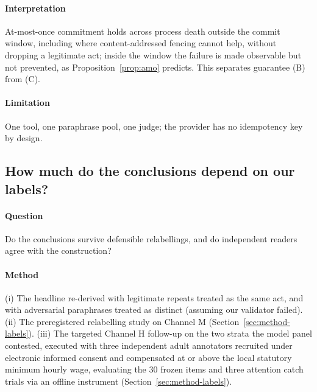 \paragraph{Interpretation} At-most-once commitment holds across process death outside the commit window, including where content-addressed fencing cannot help, without dropping a legitimate act; inside the window the failure is made observable but not prevented, as Proposition~\ref{prop:amo} predicts. This separates guarantee (B) from (C).

\paragraph{Limitation} One tool, one paraphrase pool, one judge; the provider has no idempotency key by design.

\subsection{How much do the conclusions depend on our labels?}\label{sec:res-labels}

\paragraph{Question} Do the conclusions survive defensible relabellings, and do independent readers agree with the construction?

\paragraph{Method} (i) The headline re-derived with legitimate repeats treated as the same act, and with adversarial paraphrases treated as distinct (assuming our validator failed). (ii) The preregistered relabelling study on Channel M (Section~\ref{sec:method-labels}). (iii) The targeted Channel H follow-up on the two strata the model panel contested, executed with three independent adult annotators recruited under electronic informed consent and compensated at or above the local statutory minimum hourly wage, evaluating the 30 frozen items and three attention catch trials via an offline instrument (Section~\ref{sec:method-labels}).

